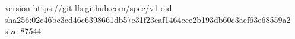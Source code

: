 version https://git-lfs.github.com/spec/v1
oid sha256:02c46bc3cd46e6398661db57e31f23eaf1464ece2b193db60c3aef63e68559a2
size 87544
